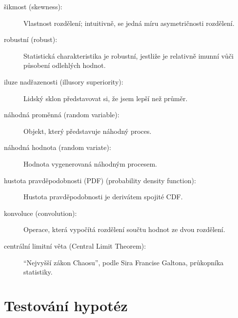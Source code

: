\documentclass[12pt]{book}
\begin{document}
\begin{description}

\item[šikmost (skewness):] Vlastnost rozdělení; intuitivně, se jedná míru asymetričnosti rozdělení.

\item[robustní (robust):] Statistická charakteristika je robustní, jestliže je relativně imunní vůči působení odlehlých hodnot.

\item[iluze nadřazenosti (illusory superiority):] Lidský sklon představovat si, že jsem lepší než průměr.

\item[náhodná proměnná (random variable):] Objekt, který představuje náhodný proces.

\item[náhodná hodnota (random variate):] Hodnota vygenerovaná náhodným procesem.

\item[hustota pravděpodobnosti (PDF) (probability density function):] Hustota pravděpodobnosti je derivátem spojité CDF.

\item[konvoluce (convolution):] Operace, která vypočítá rozdělení součtu hodnot ze dvou rozdělení.



\item[centrální limitní věta (Central Limit Theorem):] ``Nejvyšší zákon Chaosu'', podle Sira Francise Galtona, průkopníka statistiky.

\end{description}


\chapter{Testování hypotéz}
\label{testing}
\end{document}
